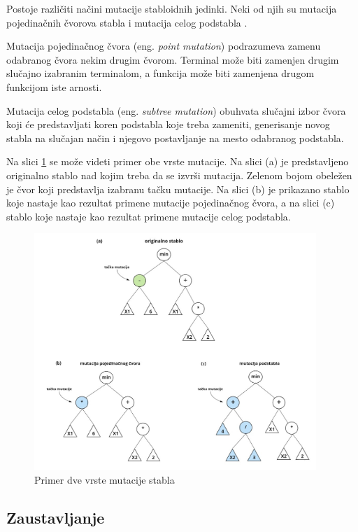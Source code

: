 \documentclass[main.tex]{subfiles}
\begin{document}
Postoje različiti načini mutacije stabloidnih jedinki. Neki od njih su mutacija pojedinačnih čvorova stabla i mutacija celog podstabla \cite{ziprian}.

Mutacija pojedinačnog čvora (eng. \textit{point mutation}) podrazumeva zamenu odabranog čvora nekim drugim čvorom. Terminal može biti zamenjen drugim slučajno izabranim terminalom, a funkcija može biti zamenjena drugom funkcijom iste arnosti.

Mutacija celog podstabla (eng. \textit{subtree mutation}) obuhvata slučajni izbor čvora koji će predstavljati koren podstabla koje treba zameniti, generisanje novog stabla na slučajan način i njegovo postavljanje na mesto odabranog podstabla.

Na slici \ref{fig:mutation} se može videti primer obe vrste mutacije. Na slici (a) je predstavljeno originalno stablo nad kojim treba da se izvrši mutacija. Zelenom bojom  obeležen je čvor koji predstavlja izabranu tačku mutacije. Na slici (b) je prikazano stablo koje nastaje kao rezultat primene mutacije pojedinačnog čvora, a na slici (c) stablo koje nastaje kao rezultat primene mutacije celog podstabla.

\begin{figure}[!ht]
\begin{center}
\includegraphics[width=0.95\textwidth]{../images/mutation4.jpg}
\end{center}
\caption{Primer dve vrste mutacije stabla}
\label{fig:mutation}
\end{figure}


\subsection{Zaustavljanje}
\label{sec:stopCondition}
\end{document}
